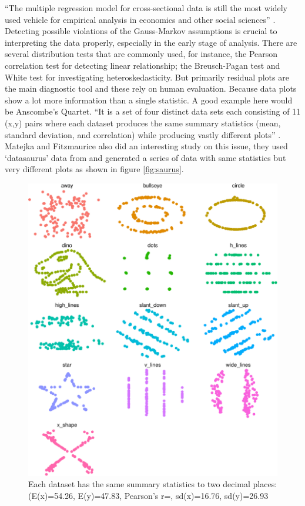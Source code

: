 \documentclass[12pt]{article}
\begin{document}
``The multiple regression model for cross-sectional data is still the
most widely used vehicle for empirical analysis in economics and other
social sciences'' \citep{IE17}. Detecting possible violations of the
Gauss-Markov assumptions is crucial to interpreting the data properly,
especially in the early stage of analysis.\citep{zeileis2002} There are
several distribution tests that are commonly used, for instance, the
Pearson correlation test for detecting linear relationship; the
Breusch-Pagan test and White test for investigating heteroskedasticity.
But primarily residual plots are the main diagnostic tool and these rely
on human evaluation. Because data plots show a lot more information than
a single statistic. A good example here would be Anscombe's Quartet.
``It is a set of four distinct data sets each consisting of 11 (x,y)
pairs where each dataset produces the same summary statistics (mean,
standard deviation, and correlation) while producing vastly different
plots'' \citep{ANS73}. Matejka and Fitzmaurice also did an interesting
study on this issue, they used `datasaurus' data from \citet{DS16} and
generated a series of data with same statistics but very different plots
as shown in figure \ref{fig:saurus}. \citep{JM17}

\begin{figure}
\centering
\includegraphics{pc_plots_files/figure-latex/saurus-1.pdf}
\caption{Each dataset has the same summary statistics to two decimal
places: (E(x)=54.26, E(y)=47.83, Pearson's r=, sd(x)=16.76, sd(y)=26.93}
\end{figure}
\end{document}
